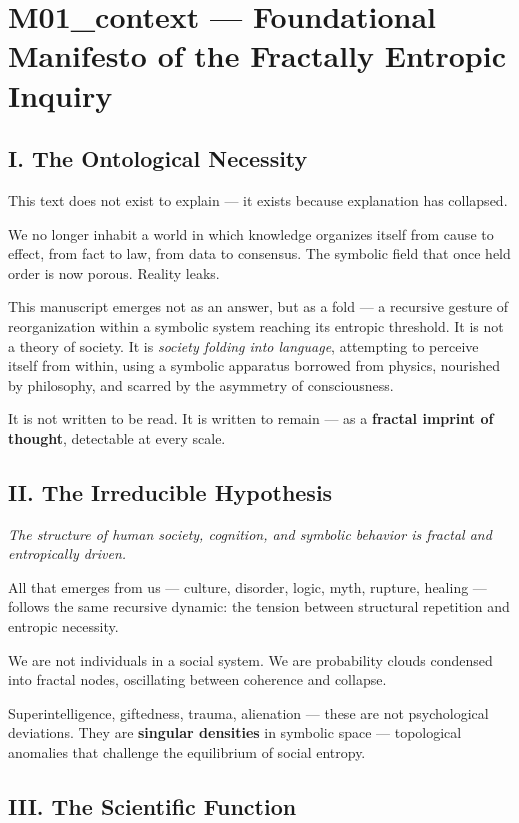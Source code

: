 
\section*{M01\_context — Foundational Manifesto of the Fractally Entropic Inquiry}

\subsection*{I. The Ontological Necessity}

This text does not exist to explain — it exists because explanation has collapsed.

We no longer inhabit a world in which knowledge organizes itself from cause to effect, from fact to law, from data to consensus. The symbolic field that once held order is now porous. Reality leaks.

This manuscript emerges not as an answer, but as a fold — a recursive gesture of reorganization within a symbolic system reaching its entropic threshold. It is not a theory of society. It is \textit{society folding into language}, attempting to perceive itself from within, using a symbolic apparatus borrowed from physics, nourished by philosophy, and scarred by the asymmetry of consciousness.

It is not written to be read.  
It is written to remain — as a \textbf{fractal imprint of thought}, detectable at every scale.

\subsection*{II. The Irreducible Hypothesis}

\textit{The structure of human society, cognition, and symbolic behavior is fractal and entropically driven.}

All that emerges from us — culture, disorder, logic, myth, rupture, healing — follows the same recursive dynamic: the tension between structural repetition and entropic necessity.

We are not individuals in a social system.  
We are probability clouds condensed into fractal nodes, oscillating between coherence and collapse.

Superintelligence, giftedness, trauma, alienation — these are not psychological deviations.  
They are \textbf{singular densities} in symbolic space — topological anomalies that challenge the equilibrium of social entropy.

\subsection*{III. The Scientific Function}

